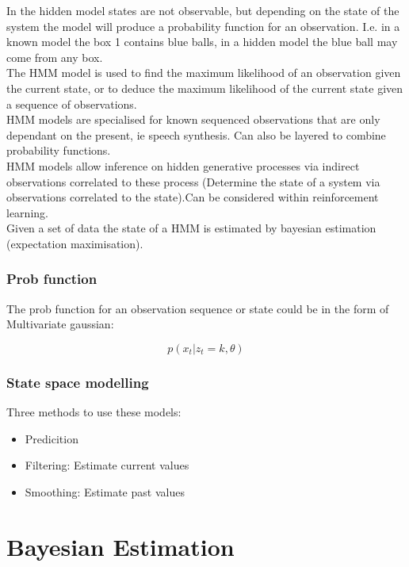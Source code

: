 \documentclass[11pt]{scrartcl} %
\begin{document}
In the hidden model states are not observable, but depending on the state of the system the model will produce
a probability function for an observation. I.e. in a known model the box 1 contains blue balls, in a hidden model
the blue ball may come from any box.\\

The HMM model is used to find the maximum likelihood of an observation given the current state, or to deduce
the maximum likelihood of the current state given a sequence of observations.\\

HMM models are specialised for known sequenced observations that are only dependant on the present, ie speech
synthesis. Can also be layered to combine probability functions.\\

HMM models allow inference on hidden generative processes via indirect observations correlated to these process
(Determine the state of a system via observations correlated to the state).Can be considered within reinforcement learning.\\

Given a set of data the state of a HMM is estimated by bayesian estimation (expectation maximisation).

\subsubsection{Prob function}

The prob function for an observation sequence or state could be in the form of Multivariate gaussian:

\begin{equation}
	p(x_t|z_t=k,\theta)
\end{equation}

\subsubsection{State space modelling}

Three methods to use these models:

\begin{itemize}
	\item Predicition
	\item Filtering: Estimate current values
	\item Smoothing: Estimate past values
\end{itemize}

\section{Bayesian Estimation}
\end{document}
